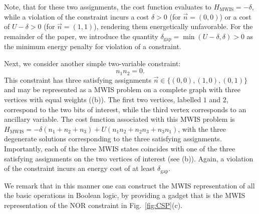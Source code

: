 Note, that for these two assignments, the cost function evaluates to $H_\text{MWIS} = -\delta$, while a violation of the constraint incurs a cost  $\delta>0$ (for  $\vec{n} = (0, 0)$) or a cost of $U - \delta>0$ (for  $\vec{n} = (1, 1)$), rendering them energetically unfavorable. For the remainder of the paper, we introduce the quantity $\delta_{\text{gap}} = \min( U - \delta, \delta) > 0$ as the minimum energy penalty for violation of a constraint. 

Next, we consider another simple two-variable constraint:
\begin{equation} \label{constraint}
    n_1 n_2 = 0.
\end{equation}
This constraint has three satisfying assignments $\vec{n} \in \{ (0,0), (1,0), (0, 1) \}$ and may be represented as a MWIS problem on a complete graph with three vertices with equal weights ((b)). The first two vertices, labelled $1$ and $2$, correspond to the two bits of interest, while the third vertex corresponds to an ancillary variable. 
The cost function associated with this MWIS problem is $H_\text{MWIS} = -\delta(n_1 + n_2 + n_3) + U(n_1 n_2 + n_2 n_3 + n_3 n_1)$, with the three degenerate solutions corresponding to the three satisfying assignments.  Importantly, each of the three MWIS states coincides with one of the three satisfying assignments on the two vertices of interest (see (b)). Again, a violation of the constraint incurs an energy cost of at least $\delta_{\text{gap}}$. 

We remark that in this manner one can construct the MWIS representation of all the basic operations in Boolean logic, by providing a gadget that is the MWIS representation of the NOR constraint in Fig.~\ref{fig:CSP}(c).

